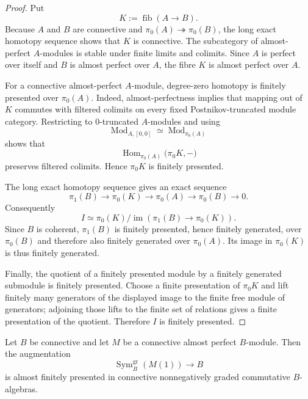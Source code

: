 \begin{proof}
Put
\[
    K:=\operatorname{fib}(A\to B).
\]
Because $A$ and $B$ are connective and $\pi_0(A)\twoheadrightarrow\pi_0(B)$,
the long exact homotopy sequence shows that $K$ is connective.  The
subcategory of almost-perfect $A$-modules is stable under finite limits and
colimits.  Since $A$ is perfect over itself and $B$ is almost perfect over
$A$, the fibre $K$ is almost perfect over $A$.

For a connective almost-perfect $A$-module, degree-zero homotopy is finitely
presented over $\pi_0(A)$.  Indeed, almost-perfectness implies that mapping
out of $K$ commutes with filtered colimits on every fixed
Postnikov-truncated module category.  Restricting to $0$-truncated
$A$-modules and using
\[
    \operatorname{Mod}_{A,[0,0]}
    \simeq
    \operatorname{Mod}_{\pi_0(A)}
\]
shows that
\[
    \operatorname{Hom}_{\pi_0(A)}\bigl(\pi_0K,-\bigr)
\]
preserves filtered colimits.  Hence $\pi_0K$ is finitely presented.

The long exact homotopy sequence gives an exact sequence
\[
    \pi_1(B)
    \longrightarrow
    \pi_0(K)
    \longrightarrow
    \pi_0(A)
    \longrightarrow
    \pi_0(B)
    \longrightarrow0.
\]
Consequently
\[
    I
    \simeq
    \pi_0(K)\big/
    \operatorname{im}\!\left(\pi_1(B)\to\pi_0(K)\right).
\]
Since $B$ is coherent, $\pi_1(B)$ is finitely presented, hence finitely
generated, over $\pi_0(B)$ and therefore also finitely generated over
$\pi_0(A)$.  Its image in $\pi_0(K)$ is thus finitely generated.

Finally, the quotient of a finitely presented module by a finitely generated
submodule is finitely presented.  Choose a finite presentation of $\pi_0K$
and lift finitely many generators of the displayed image to the finite free
module of generators; adjoining those lifts to the finite set of relations
gives a finite presentation of the quotient.  Therefore $I$ is finitely
presented.
\end{proof}

\begin{lemma}
\label{lem:bnla-positive-graded-aft}
Let $B$ be connective and let $M$ be a connective almost perfect $B$-module.
Then the augmentation
\[
    \operatorname{Sym}^{\mathrm{gr}}_B(M(1))\longrightarrow B
\]
is almost finitely presented in connective nonnegatively graded commutative
$B$-algebras.
\end{lemma}


